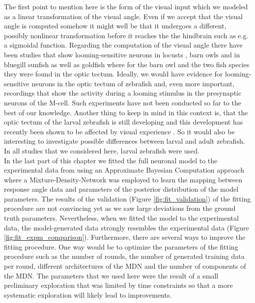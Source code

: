     The first point to mention here is the form of the visual input which we modeled as a linear transformation of the visual angle.
    Even if we accept that the visual angle is computed somehow it might well be that it undergoes a different, possibly nonlinear transformation before it reaches the the hindbrain such as e.g. a sigmoidal function.
    Regarding the computation of the visual angle there have been studies that show looming-sensitive neurons in locusts \citep{Hatsopoulos1995}, barn owls \citep{Mysore2010} and in bluegill sunfish as well as goldfish \citep{Gallagher2006} where for the barn owl and the two fish species they were found in the optic tectum.
    Ideally, we would have evidence for looming-sensitive neurons in the optic tectum of zebrafish and, even more important, recordings that show the activity during a looming stimulus in the presynaptic neurons of the M-cell.
    Such experiments have not been conducted so far to the best of our knowledge.
    Another thing to keep in mind in this context is, that the optic tectum of the larval zebrafish is still developing and this development has recently been shown to be affected by visual experience \citep{Avitan2017}.
    So it would also be interesting to investigate possible differences between larval and adult zebrafish.
    In all studies that we considered here, larval zebrafish were used.\\
    In the last part of this chapter we fitted the full neuronal model to the experimental data from \cite{Bhattacharyya2017} using an Approximate Bayesian Computation approach where a Mixture-Density-Network was employed to learn the mapping between response angle data and parameters of the posterior distribution of the model parameters.
    The results of the validation (Figure \ref{fig:fit_validation}) of the fitting procedure are not convincing yet as we saw large deviations from the ground truth parameters.
    Nevertheless, when we fitted the model to the experimental data, the model-generated data strongly resembles the experimental data (Figure \ref{fig:fit_expm_comparison}).
    Furthermore, there are several ways to improve the fitting procedure.
    One way would be to optimize the parameters of the fitting procedure such as the number of rounds, the number of generated training data per round, different architectures of the MDN and the number of components of the MDN.
    The parameters that we used here were the result of a small preliminary exploration that was limited by time constraints so that a more systematic exploration will likely lead to improvements.\\
